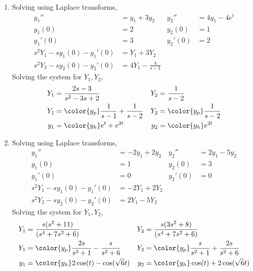 \begin{enumerate}
    \item Solving using Laplace transforms,
          \begin{align}
              y_1''                       & = y_1 + 3y_2           &
              y_2''                       & = 4y_1 - 4e^t            \\
              y_1(0)                      & = 2                    &
              y_2(0)                      & = 1                      \\
              y_1'(0)                     & = 3                    &
              y_2'(0)                     & = 2                      \\
              s^2 Y_1 - sy_1(0) - y_1'(0) & = Y_1 + 3Y_2             \\
              s^2 Y_2 - sy_2(0) - y_2'(0) & = 4Y_1 - \frac{4}{s-1}
          \end{align}
          Solving the system for $ Y_1, Y_2 $,
          \begin{align}
              Y_1 & = \frac{2s-3}{s^2 - 3s + 2}                 &
              Y_2 & = \frac{1}{s - 2}                             \\
              Y_1 & = \color{y_p} \frac{1}{s-1} + \frac{1}{s-2} &
              Y_2 & = \color{y_p} \frac{1}{s - 2}                 \\
              y_1 & = \color{y_h} e^t + e^{2t}                  &
              y_2 & = \color{y_h} e^{2t}
          \end{align}

    \item Solving using Laplace transforms,
          \begin{align}
              y_1''                       & = -2y_1 + 2y_2 &
              y_2''                       & = 2y_1 - 5y_2    \\
              y_1(0)                      & = 1            &
              y_2(0)                      & = 3              \\
              y_1'(0)                     & = 0            &
              y_2'(0)                     & = 0              \\
              s^2 Y_1 - sy_1(0) - y_1'(0) & = -2Y_1 + 2Y_2   \\
              s^2 Y_2 - sy_2(0) - y_2'(0) & = 2Y_1 - 5Y_2
          \end{align}
          Solving the system for $ Y_1, Y_2 $,
          \begin{align}
              Y_1 & = \frac{s(s^2 + 11)}{(s^4 + 7s^2 + 6)}               &
              Y_2 & = \frac{s(3s^2 + 8)}{(s^4 + 7s^2 + 6)}                 \\
              Y_1 & = \color{y_p} \frac{2s}{s^2 + 1} - \frac{s}{s^2 + 6} &
              Y_2 & = \color{y_p} \frac{s}{s^2 + 1} + \frac{2s}{s^2 + 6}   \\
              y_1 & = \color{y_h} 2\cos(t) - \cos(\sqrt{6}t)             &
              y_2 & = \color{y_h} \cos(t) + 2\cos(\sqrt{6}t)
          \end{align}


\end{enumerate}
